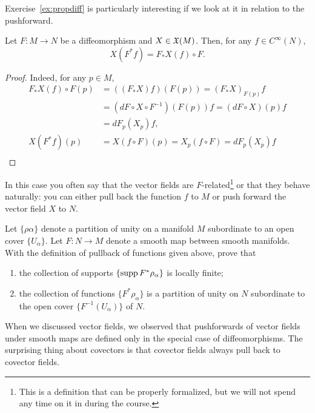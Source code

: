 Exercise~\ref{ex:propdiff} is particularly interesting if we look at it in relation to the pushforward.
\begin{proposition}
  Let $F:M\to N$ be a diffeomorphism and $X\in\mathfrak{X}(M)$.
  Then, for any $f\in C^\infty(N)$,
  \begin{equation}
    X(F^* f) = F_*X(f) \circ F.
\end{equation}
\end{proposition}
\begin{proof}
  Indeed, for any $p\in M$,
\begin{align}
  F_*X(f) \circ F(p) &= ((F_*X) f) (F(p)) = (F_*X)_{F(p)} f \\
  &= (dF \circ X \circ F^{-1})(F(p)) f = (dF\circ X)(p) f \\
  &= dF_p(X_p) f, \\
  X (F^*f)(p) & = X(f\circ F)(p) = X_p(f\circ F) = dF_p(X_p) f \\
\end{align}
\end{proof}
In this case you often say that the vector fields are $F$-related\footnote{This is a definition that can be properly formalized, but we will not spend any time on it in during the course.} or that they behave naturally: you can either pull back the function $f$ to $M$ or push forward the vector field $X$ to $N$.

\begin{exercise}
  Let $\{\rho\alpha\}$ denote a partition of unity on a manifold $M$ subordinate to an open cover $\{U_\alpha\}$.
  Let $F:N\to M$ denote a smooth map between smooth manifolds.
  With the definition of pullback of functions given above, prove that
  \begin{enumerate}
    \item the collection of supports $\{\operatorname{supp} F^*\rho_\alpha\}$ is locally finite;
    \item the collection of functions $\{F^*\rho_\alpha\}$ is a partition of unity on $N$ subordinate to the open cover $\{F^{-1}(U_\alpha)\}$ of $N$.
  \end{enumerate}
\end{exercise}

When we discussed vector fields, we observed that pushforwards of vector fields under smooth maps are defined only in the special case of diffeomorphisms.
The surprising thing about covectors is that covector fields always pull back to covector fields.

